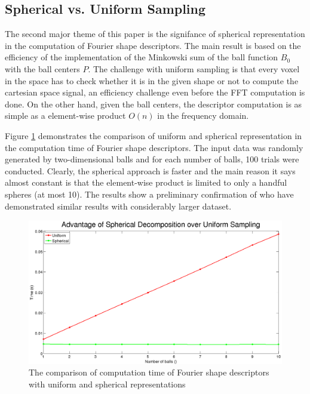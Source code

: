 \documentclass[letterpaper, 10 pt, conference]{ieeeconf}
\begin{document}
\subsection{Spherical vs. Uniform Sampling}

The second major theme of this paper is the signifance of spherical representation in the computation
of Fourier shape descriptors. The main result is based on the efficiency of the implementation of the Minkowski sum of the ball function
$B_0$ with the ball centers $P$. The challenge with uniform sampling is that every voxel in the space
has to check whether it is in the given shape or not to compute the cartesian space signal, an efficiency
challenge even before the FFT computation is done. On the other hand, given the ball centers, the
descriptor computation is as simple as a element-wise product $O(n)$ in the frequency domain.

Figure \ref{fig:spherical} demonstrates the comparison of uniform and spherical representation
in the computation time of Fourier shape descriptors. The input data was randomly generated by two-dimensional
balls and for each number of balls, 100 trials were conducted. Clearly, the spherical approach 
is faster and the main reason it says almost constant is that the element-wise product is
limited to only a handful spheres (at most 10). The results show a preliminary confirmation
of \cite{behandish2016analytic} who have demonstrated similar results with considerably larger
dataset.

\begin{figure}[ht!] 
  \centering
  \includegraphics[width=1.0\linewidth]{Figures/spherical.png}
  \caption{The comparison of computation time of Fourier shape descriptors with uniform and spherical representations}
  \label{fig:spherical}
\end{figure}
\end{document}
